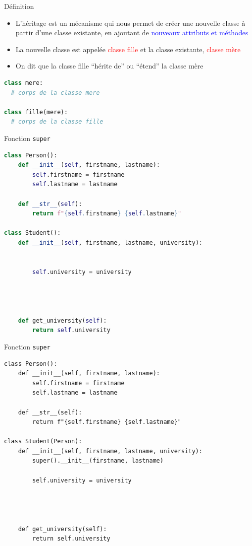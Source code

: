 \documentclass[10pt]{beamer}
\begin{document}
\begin{frame}[fragile]{Définition}

  \begin{itemize}
    \item L'héritage est un mécanisme qui nous permet de créer une nouvelle classe à partir d'une classe existante, en ajoutant de \textcolor{blue}{nouveaux attributs et méthodes}
    \item La nouvelle classe est appelée \textcolor{red}{classe fille} et la classe existante, \textcolor{red}{classe mère}
    \item On dit que la classe fille ``hérite de'' ou  ``étend'' la classe mère
  \end{itemize}

\begin{lstlisting}[language=python, numbers=none]
class mere:
  # corps de la classe mere

class fille(mere):
  # corps de la classe fille
\end{lstlisting}

\end{frame}

\begin{frame}[fragile]{Fonction \texttt{super}}
\begin{lstlisting}[language=python, numbers=none]
class Person():
    def __init__(self, firstname, lastname):
        self.firstname = firstname
        self.lastname = lastname

    def __str__(self):
        return f"{self.firstname} {self.lastname}"

class Student():
    def __init__(self, firstname, lastname, university):


        self.university = university        
    



    def get_university(self):
        return self.university
\end{lstlisting}
  \end{frame}



\begin{frame}[fragile]{Fonction \texttt{super}}
\begin{lstlisting}[numbers=none, morekeywords={Person, super}]
class Person():
    def __init__(self, firstname, lastname):
        self.firstname = firstname
        self.lastname = lastname

    def __str__(self):
        return f"{self.firstname} {self.lastname}"

class Student(Person):
    def __init__(self, firstname, lastname, university):
        super().__init__(firstname, lastname)

        self.university = university        
    



    def get_university(self):
        return self.university
\end{lstlisting}
  \end{frame}
\end{document}
